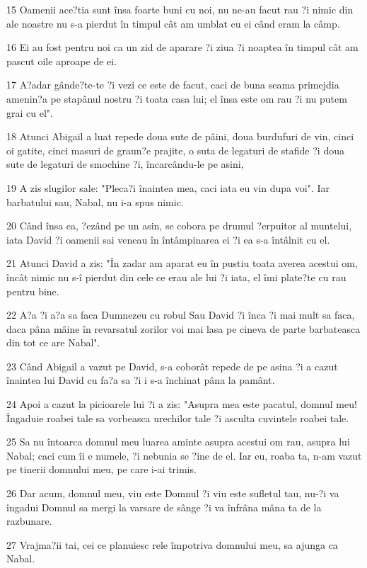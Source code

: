 \par 15 Oamenii ace?tia sunt însa foarte buni cu noi, nu ne-au facut rau ?i nimic din ale noastre nu s-a pierdut în timpul cât am umblat cu ei când eram la câmp.
\par 16 Ei au fost pentru noi ca un zid de aparare ?i ziua ?i noaptea în timpul cât am pascut oile aproape de ei.
\par 17 A?adar gânde?te-te ?i vezi ce este de facut, caci de buna seama primejdia amenin?a pe stapânul nostru ?i toata casa lui; el însa este om rau ?i nu putem grai cu el".
\par 18 Atunci Abigail a luat repede doua sute de pâini, doua burdufuri de vin, cinci oi gatite, cinci masuri de graun?e prajite, o suta de legaturi de stafide ?i doua sute de legaturi de smochine ?i, încarcându-le pe asini,
\par 19 A zis slugilor sale: "Pleca?i înaintea mea, caci iata eu vin dupa voi". Iar barbatului sau, Nabal, nu i-a spus nimic.
\par 20 Când însa ea, ?ezând pe un asin, se cobora pe drumul ?erpuitor al muntelui, iata David ?i oamenii sai veneau în întâmpinarea ei ?i ea s-a întâlnit cu el.
\par 21 Atunci David a zis: "În zadar am aparat eu în pustiu toata averea acestui om, încât nimic nu s-î pierdut din cele ce erau ale lui ?i iata, el îmi plate?te cu rau pentru bine.
\par 22 A?a ?i a?a sa faca Dumnezeu cu robul Sau David ?i înca ?i mai mult sa faca, daca pâna mâine în revarsatul zorilor voi mai lasa pe cineva de parte barbateasca din tot ce are Nabal".
\par 23 Când Abigail a vazut pe David, s-a coborât repede de pe asina ?i a cazut înaintea lui David cu fa?a sa ?i i s-a închinat pâna la pamânt.
\par 24 Apoi a cazut la picioarele lui ?i a zis: "Asupra mea este pacatul, domnul meu! Îngaduie roabei tale sa vorbeasca urechilor tale ?i asculta cuvintele roabei tale.
\par 25 Sa nu întoarca domnul meu luarea aminte asupra acestui om rau, asupra lui Nabal; caci cum îi e numele, ?i nebunia se ?ine de el. Iar eu, roaba ta, n-am vazut pe tinerii domnului meu, pe care i-ai trimis.
\par 26 Dar acum, domnul meu, viu este Domnul ?i viu este sufletul tau, nu-?i va îngadui Domnul sa mergi la varsare de sânge ?i va înfrâna mâna ta de la razbunare.
\par 27 Vrajma?ii tai, cei ce planuiesc rele împotriva domnului meu, sa ajunga ca Nabal.
